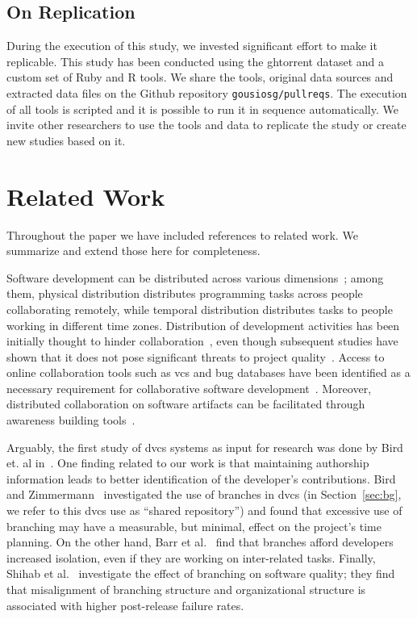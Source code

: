 \documentclass{sig-alternate}
\begin{document}
\subsection{On Replication}

During the execution of this study, we invested significant effort to
make it replicable. This study has been conducted using the {\sc ght}orrent dataset
and a custom set of Ruby and R tools. We share the tools, original data sources
and extracted data files on the Github repository \texttt{gousiosg/pullreqs}.
The execution of all tools is scripted and it is possible to run it
in sequence automatically. We invite other researchers to use the tools and data
to replicate the study or create new studies based on it.

\section{Related Work}

Throughout the paper we have included references to related work. We summarize
and extend those here for completeness.

Software development can be distributed across various
dimensions~\cite{Gumm06}; among them, physical distribution distributes
programming tasks across people collaborating remotely, while temporal
distribution distributes tasks to people working in different time zones.
Distribution of development activities has been initially thought to hinder
collaboration~\cite{Herbs99, Batti01}, even though subsequent studies have
shown that it does not pose significant threats to project
quality~\cite{Spine06, Nguye08, Bird09a}. Access to online collaboration tools
such as {\sc vcs} and bug databases have been identified as a necessary
requirement for collaborative software development~\cite{Knuds76,Pilat06,
Catal06}. Moreover, distributed collaboration on software artifacts can be
facilitated through awareness building tools~\cite{Dabbi12, Treud12, Lanza10}. 

Arguably, the first study of {\sc dvcs} systems as input for research was done
by Bird et. al in~\cite{Bird09}. One finding related to our work is that
maintaining authorship information leads to better identification of the
developer's contributions.  Bird and Zimmermann~\cite{Bird12} investigated the
use of branches in {\sc dvcs} (in Section~\ref{sec:bg}, we refer to this {\sc
dvcs} use as ``shared repository'') and found that excessive use of branching
may have a measurable, but minimal, effect on the project's time planning.
On the other hand, Barr et al.~\cite{Barr12} find that branches afford developers
increased isolation, even if they are working on inter-related tasks.
Finally, Shihab et al.~\cite{Shiha12} investigate the effect of branching on
software quality; they find that misalignment of branching structure and organizational structure is associated with higher post-release failure rates.
\end{document}
